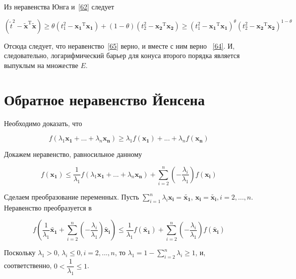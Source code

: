 	Из неравенства Юнга и~\eqref{62} следует
	
	\begin{equation}
	(\tilde{t}^2 - \mathbf{\tilde{x}}^\text{T} \mathbf{\tilde{x}})\geqslant \theta
	(t_1^2 - \mathbf{x_1}^\text{T} \mathbf{x_1}) + (1-\theta)(t_2^2 -
	\mathbf{x_2}^\text{T} \mathbf{x_2}) \geqslant (t_1^2 - \mathbf{x_1}^\text{T}
	\mathbf{x_1})^{\theta} (t_2^2 - \mathbf{x_2}^\text{T} \mathbf{x_2})^{1-\theta}
	\end{equation}
	
	Отсюда следует, что неравенство~\eqref{65} верно, и вместе с ним верно
	~\eqref{64}. И, следовательно, логарифмический барьер для конуса второго порядка
	является выпуклым на множестве $E$.
	
	\section{Обратное неравенство Йенсена}
	
	Необходимо доказать, что
	
	\begin{equation}
	f(\lambda_1 \mathbf{x_1} + ... + \lambda_n \mathbf{x_n} ) \geqslant \lambda_1
	f(\mathbf{x_1}) + ... + \lambda_n f(\mathbf{x_n})
	\end{equation}
	
	Докажем неравенство, равносильное данному
	
	\begin{equation}
	f(\mathbf{x_1})  \leqslant \frac{1}{\lambda_1}f(\lambda_1 \mathbf{x_1} +
	...+\lambda_n\mathbf{x_n})  + \sum\limits_{i=2}^{n}
	(-\frac{\lambda_i}{\lambda_1} )  f(\mathbf{x_i})
	\end{equation}
	
	Сделаем преобразование переменных. Пусть $\sum\limits_{i=1}^{n} \lambda_i
	\mathbf{x_i} = \mathbf{\tilde{x_1}}$, $\mathbf{x_i} = \mathbf{\tilde{x_i}},
	i=2,...,n$. Неравенство преобразуется в
	
	\begin{equation}
	f(\frac{1}{\lambda_1}\mathbf{\tilde{x_1}}  + \sum\limits_{i=2}^{n}
	(-\frac{\lambda_i}{\lambda_1} )  \mathbf{\tilde{x_i}})  \leqslant
	\frac{1}{\lambda_1}f(\mathbf{\tilde{x_1}})  + \sum\limits_{i=2}^{n}
	(-\frac{\lambda_i}{\lambda_1} )  f(\mathbf{\tilde{x_i}})
	\end{equation}
	
	Поскольку $\lambda_1 > 0$, $\lambda_i \leqslant 0, i=2,...,n$, то $\lambda_1 =
	1 - \sum\limits_{i=2}^{n}\lambda_i \geqslant 1$, и, соответственно, $0 <
	\dfrac{1}{\lambda_1} \leqslant 1$. 
	

